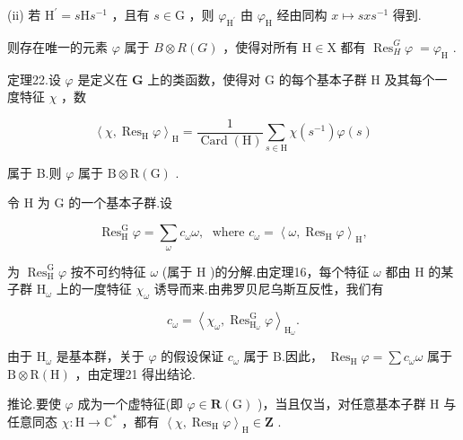 \documentclass[10pt]{article}
\begin{document}
(ii) 若 \({\mathrm{H}}^{\prime } = s\mathrm{H}{s}^{-1}\) ，且有 \(s \in  \mathrm{G}\) ，则 \({\varphi }_{{\mathrm{H}}^{\prime }}\) 由 \({\varphi }_{\mathrm{H}}\) 经由同构 \(x \mapsto  {sx}{s}^{-1}\) 得到.

则存在唯一的元素 \(\varphi\) 属于 \(B \otimes  R\left( G\right)\) ，使得对所有 \(\mathrm{H} \in  \mathrm{X}\) 都有 \({\operatorname{Res}}_{H}^{G}\varphi \; = {\varphi }_{\mathrm{H}}\) .

定理22.设 \(\varphi\) 是定义在 \(\mathbf{G}\) 上的类函数，使得对 \(\mathrm{G}\) 的每个基本子群 \(\mathrm{H}\) 及其每个一度特征 \(\chi\) ，数

\[
{\left\langle  \chi ,{\operatorname{Res}}_{\mathrm{H}}\varphi \right\rangle  }_{\mathrm{H}} = \frac{1}{\operatorname{Card}\left( \mathrm{H}\right) }\mathop{\sum }\limits_{{s \in  \mathrm{H}}}\chi \left( {s}^{-1}\right) \varphi \left( s\right)
\]

属于 B.则 \(\varphi\) 属于 \(\mathrm{B} \otimes  \mathrm{R}\left( \mathrm{G}\right)\) .

令 \(\mathrm{H}\) 为 \(\mathrm{G}\) 的一个基本子群.设

\[
{\operatorname{Res}}_{\mathrm{H}}^{\mathrm{G}}\varphi  = \mathop{\sum }\limits_{\omega }{c}_{\omega }\omega ,\;\text{ where }{c}_{\omega } = {\left\langle  \omega ,{\operatorname{Res}}_{\mathrm{H}}\varphi \right\rangle  }_{\mathrm{H}},
\]

为 \({\operatorname{Res}}_{\mathrm{H}}^{\mathrm{G}}\varphi\) 按不可约特征 \(\omega\) (属于 \(\mathrm{H}\) )的分解.由定理16，每个特征 \(\omega\) 都由 \(\mathrm{H}\) 的某子群 \({\mathrm{H}}_{\omega }\) 上的一度特征 \({\chi }_{\omega }\) 诱导而来.由弗罗贝尼乌斯互反性，我们有

\[
{c}_{\omega } = {\left\langle  {\chi }_{\omega },{\operatorname{Res}}_{{\mathrm{H}}_{\omega }}^{\mathrm{G}}\varphi \right\rangle  }_{{\mathrm{H}}_{\omega }}.
\]

由于 \({\mathrm{H}}_{\omega }\) 是基本群，关于 \(\varphi\) 的假设保证 \({c}_{\omega }\) 属于 B.因此， \({\operatorname{Res}}_{\mathrm{H}}\varphi  = \sum {c}_{\omega }\omega\) 属于 \(\mathrm{B} \otimes  \mathrm{R}\left( \mathrm{H}\right)\) ，由定理21 得出结论.

推论.要使 \(\varphi\) 成为一个虚特征(即 \(\varphi  \in  \mathbf{R}\left( \mathrm{G}\right)\) )，当且仅当，对任意基本子群 \(\mathrm{H}\) 与任意同态 \(\chi  : \mathrm{H} \rightarrow  {\mathbb{C}}^{ * }\) ，都有 \({\left\langle  \chi ,{\operatorname{Res}}_{\mathrm{H}}\varphi \right\rangle  }_{\mathrm{H}} \in  \mathbf{Z}\) .
\end{document}
